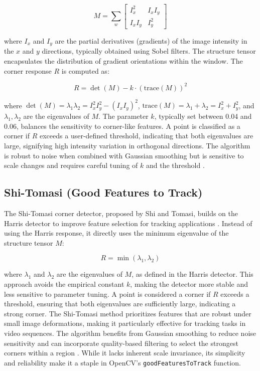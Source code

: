 \documentclass[journal]{IEEEtran}
\begin{document}
\begin{equation}
M = \sum_w \begin{bmatrix} I_x^2 & I_x I_y \\ I_x I_y & I_y^2 \end{bmatrix}
\end{equation}

where \( I_x \) and \( I_y \) are the partial derivatives (gradients) of the image intensity in the \( x \) and \( y \) directions, typically obtained using Sobel filters. The structure tensor encapsulates the distribution of gradient orientations within the window. The corner response \( R \) is computed as:

\begin{equation}
R = \det(M) - k \cdot (\text{trace}(M))^2
\end{equation}

where \( \det(M) = \lambda_1 \lambda_2 = I_x^2 I_y^2 - (I_x I_y)^2 \), \( \text{trace}(M) = \lambda_1 + \lambda_2 = I_x^2 + I_y^2 \), and \( \lambda_1, \lambda_2 \) are the eigenvalues of \( M \). The parameter \( k \), typically set between 0.04 and 0.06, balances the sensitivity to corner-like features. A point is classified as a corner if \( R \) exceeds a user-defined threshold, indicating that both eigenvalues are large, signifying high intensity variation in orthogonal directions. The algorithm is robust to noise when combined with Gaussian smoothing but is sensitive to scale changes and requires careful tuning of \( k \) and the threshold \cite{Harris_Corner}.\\

\subsection{Shi-Tomasi (Good Features to Track)}
The Shi-Tomasi corner detector, proposed by Shi and Tomasi, builds on the Harris detector to improve feature selection for tracking applications \cite{Shi_Tomasi}. Instead of using the Harris response, it directly uses the minimum eigenvalue of the structure tensor \( M \):

\begin{equation}
R = \min(\lambda_1, \lambda_2)
\end{equation}

where \( \lambda_1 \) and \( \lambda_2 \) are the eigenvalues of \( M \), as defined in the Harris detector. This approach avoids the empirical constant \( k \), making the detector more stable and less sensitive to parameter tuning. A point is considered a corner if \( R \) exceeds a threshold, ensuring that both eigenvalues are sufficiently large, indicating a strong corner. The Shi-Tomasi method prioritizes features that are robust under small image deformations, making it particularly effective for tracking tasks in video sequences. The algorithm benefits from Gaussian smoothing to reduce noise sensitivity and can incorporate quality-based filtering to select the strongest corners within a region \cite{Shi_Tomasi}. While it lacks inherent scale invariance, its simplicity and reliability make it a staple in OpenCV’s \texttt{goodFeaturesToTrack} function.\\
\end{document}
